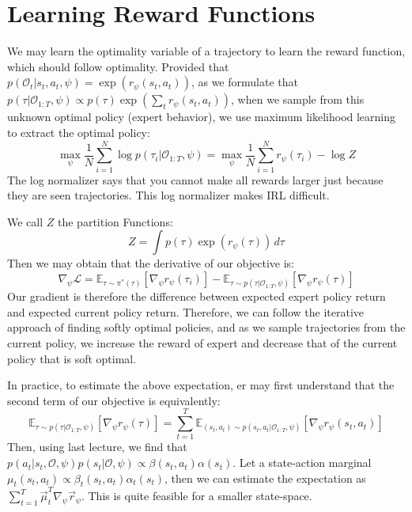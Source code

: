 \section{Learning Reward Functions}
We may learn the optimality variable of a trajectory to learn the reward function, which should follow optimality.
Provided that $p(\mathcal{O}_t | s_t, a_t, \psi) = \exp(r_\psi (s_t, a_t))$, as we formulate that $p(\tau | \mathcal{O}_{1:T}, \psi) \propto p(\tau) \exp(\sum_t r_\psi (s_t, a_t))$, when we sample from this unknown optimal policy (expert behavior), we use maximum likelihood learning to extract the optimal policy:
\[
    \max_\psi \frac{1}{N} \sum_{i=1}^N \log p(\tau_i | \mathcal{O}_{1:T}, \psi) = \max_\psi \frac{1}{N} \sum_{i=1}^N r_\psi (\tau_i) - \log Z
\]
The log normalizer says that you cannot make all rewards larger just because they are seen trajectories. This log normalizer makes IRL difficult.

We call $Z$ the partition Functions:
\[
    Z = \int p(\tau) \exp(r_\psi (\tau)) \,d\tau
\]
Then we may obtain that the derivative of our objective is:
\[
    \nabla_\psi \mathcal{L} = \mathbb{E}_{\tau \sim \pi^*(\tau)} [\nabla_\psi r_\psi (\tau_i)] - \mathbb{E}_{\tau \sim p(\tau|\mathcal{O}_{1:T}, \psi)} [\nabla_\psi r_\psi(\tau)]
\]
Our gradient is therefore the difference between expected expert policy return and expected current policy return. Therefore, we can follow the iterative approach of finding softly optimal policies, and as we sample trajectories from the current policy, we increase the reward of expert and decrease that of the current policy that is soft optimal.

In practice, to estimate the above expectation, er may first understand that the second term of our objective is equivalently:
\[
    \mathbb{E}_{\tau \sim p(\tau|\mathcal{O}_{1:T}, \psi)} [\nabla_\psi r_\psi(\tau)] = \sum_{t=1}^T \mathbb{E}_{(s_t, a_t) \sim p(s_t, a_t | \mathcal{O}_{1:T}, \psi)} [\nabla_\psi r_\psi(s_t, a_t)]
\]
Then, using last lecture, we find that $p(a_t|s_t, \mathcal{O}, \psi) p(s_t | \mathcal{O}, \psi) \propto \beta(s_t, a_t) \alpha(s_t)$.
Let a state-action marginal $\mu_t(s_t, a_t) \propto \beta_t(s_t, a_t) \alpha_t(s_t)$, then we can estimate the expectation as $\sum_{t=1}^T \vec{\mu}_t^T \nabla_\psi \vec{r}_\psi$.
This is quite feasible for a smaller state-space.

